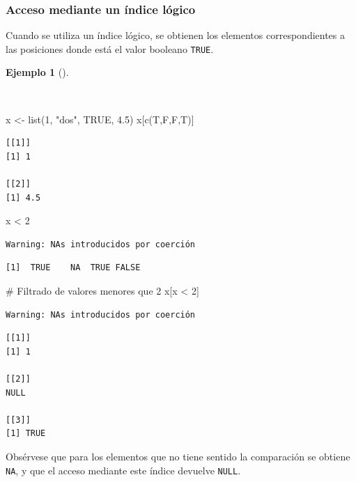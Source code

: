 \documentclass[
  spanish,
  a4paper,
]{scrreport}
\newenvironment{Shaded}{\begin{snugshade}}{\end{snugshade}}
\newcommand{\CommentTok}[1]{\textcolor[rgb]{0.37,0.37,0.37}{#1}}
\newcommand{\ConstantTok}[1]{\textcolor[rgb]{0.56,0.35,0.01}{#1}}
\newcommand{\DecValTok}[1]{\textcolor[rgb]{0.68,0.00,0.00}{#1}}
\newcommand{\FloatTok}[1]{\textcolor[rgb]{0.68,0.00,0.00}{#1}}
\newcommand{\FunctionTok}[1]{\textcolor[rgb]{0.28,0.35,0.67}{#1}}
\newcommand{\NormalTok}[1]{\textcolor[rgb]{0.00,0.23,0.31}{#1}}
\newcommand{\OtherTok}[1]{\textcolor[rgb]{0.00,0.23,0.31}{#1}}
\newcommand{\SpecialCharTok}[1]{\textcolor[rgb]{0.37,0.37,0.37}{#1}}
\newcommand{\StringTok}[1]{\textcolor[rgb]{0.13,0.47,0.30}{#1}}
\theoremstyle{definition}
\theoremstyle{definition}
\newtheorem{example}{Ejemplo}[chapter]
\theoremstyle{remark}
\begin{document}
\subsubsection{Acceso mediante un índice
lógico}\label{acceso-mediante-un-uxedndice-luxf3gico-1}

Cuando se utiliza un índice lógico, se obtienen los elementos
correspondientes a las posiciones donde está el valor booleano
\texttt{TRUE}.

\begin{example}[]\protect\hypertarget{exm-acceso-listas-logico}{}\label{exm-acceso-listas-logico}

~

\begin{Shaded}
\begin{Highlighting}[]
\NormalTok{x }\OtherTok{\textless{}{-}} \FunctionTok{list}\NormalTok{(}\DecValTok{1}\NormalTok{, }\StringTok{"dos"}\NormalTok{, }\ConstantTok{TRUE}\NormalTok{, }\FloatTok{4.5}\NormalTok{)}
\NormalTok{x[}\FunctionTok{c}\NormalTok{(T,F,F,T)]}
\end{Highlighting}
\end{Shaded}

\begin{verbatim}
[[1]]
[1] 1

[[2]]
[1] 4.5
\end{verbatim}

\begin{Shaded}
\begin{Highlighting}[]
\NormalTok{x }\SpecialCharTok{\textless{}} \DecValTok{2}
\end{Highlighting}
\end{Shaded}

\begin{verbatim}
Warning: NAs introducidos por coerción
\end{verbatim}

\begin{verbatim}
[1]  TRUE    NA  TRUE FALSE
\end{verbatim}

\begin{Shaded}
\begin{Highlighting}[]
\CommentTok{\# Filtrado de valores menores que 2}
\NormalTok{x[x }\SpecialCharTok{\textless{}} \DecValTok{2}\NormalTok{]}
\end{Highlighting}
\end{Shaded}

\begin{verbatim}
Warning: NAs introducidos por coerción
\end{verbatim}

\begin{verbatim}
[[1]]
[1] 1

[[2]]
NULL

[[3]]
[1] TRUE
\end{verbatim}

Obsérvese que para los elementos que no tiene sentido la comparación se
obtiene \texttt{NA}, y que el acceso mediante este índice devuelve
\texttt{NULL}.

\end{example}
\end{document}
